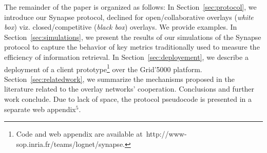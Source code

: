 %
 The remainder of the paper is organized as
follows: In Section~\ref{sec:protocol}, we introduce our Synapse
protocol, declined for open/collaborative overlays (\emph{white box})
viz. closed/com\-petitive (\emph{black box}) overlays. We provide
examples.
% 
In Section~\ref{sec:simulations}, we present the results of our
simulations of the Synapse protocol to capture the behavior of key
metrics traditionally used to measure the efficiency of information
retrieval. In Section~\ref{sec:deployement}, we describe a deployment
of a client prototype\footnote{Code and web appendix are available
  at~{\sf http://www-sop.inria.fr/teams/lognet/synapse}.}  over the
Grid'5000 platform. Section~\ref{sec:relatedwork}, we summarize the
mechanisms proposed in the literature related to the overlay networks'
cooperation.  Conclusions and further work conclude.  Due to lack of
space, the protocol pseudocode is presented in a separate web
appendix$^5$. 



